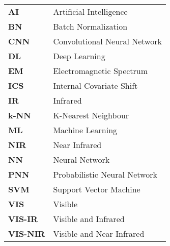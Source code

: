 	
\begin{longtable}{ll}			
        \textbf{AI} & Artificial Intelligence	\\
        \textbf{BN} & Batch Normalization	\\
        \textbf{CNN} & Convolutional Neural Network	\\
        \textbf{DL} & Deep Learning	\\
        \textbf{EM} & Electromagnetic Spectrum	\\
        \textbf{ICS} & Internal Covariate Shift	\\
        \textbf{IR} & Infrared	\\
        \textbf{k-NN} & K-Nearest Neighbour	\\
		\textbf{ML} & Machine Learning	\\
		\textbf{NIR} & Near Infrared	\\
		\textbf{NN} & Neural Network	\\
		\textbf{PNN} & Probabilistic Neural Network	\\
		\textbf{SVM} & Support Vector Machine	\\
		\textbf{VIS} & Visible	\\
		\textbf{VIS-IR} & Visible and Infrared\\
		\textbf{VIS-NIR} & Visible and Near Infrared\\
		  
\end{longtable}\label{abb} 